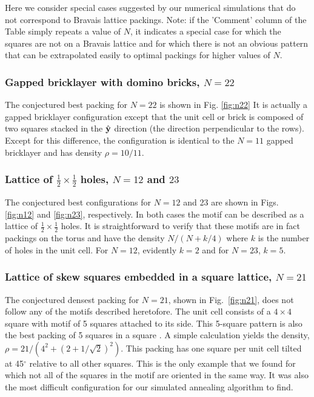 Here we consider special cases suggested by our numerical simulations that do not correspond to Bravais lattice packings.
Note: if the 'Comment' column of the Table simply repeats a value of $N$, it indicates a special case for which the squares are not on a Bravais lattice and for which there is not an obvious pattern that can be extrapolated easily to optimal packings for higher values of $N$.

\subsubsection{Gapped bricklayer with domino bricks, $N=22$}
The conjectured best packing for $N=22$ is shown in Fig. \ref{fig:n22} It is actually a gapped bricklayer configuration except that the unit cell or brick is composed of two squares stacked in the $\hat{{\bf y}}$ direction (the direction perpendicular to the rows).  Except for this difference, the configuration is identical to the $N=11$ gapped bricklayer and has density $\rho= 10/11$.

\subsubsection{Lattice of $\frac{1}{2}\times\frac{1}{2}$ holes, $N=12$ and $23$}
The conjectured best configurations for $N=12$ and 23 are shown in Figs. \ref{fig:n12} and \ref{fig:n23}, respectively.  In both cases the motif can be described as a lattice of $\frac{1}{2}\times\frac{1}{2}$ holes. It is straightforward to verify that these motifs are in fact packings on the torus and have the density $N/(N+k/4)$ where $k$ is the number of holes in the unit cell.  For $N=12$, evidently $k=2$ and for $N=23$, $k=5$. 


\subsubsection{Lattice of skew squares embedded in a square lattice, $N=21$}
The conjectured densest packing for  $N=21$, shown in Fig.\ \ref{fig:n21}, does not follow any of the motifs described heretofore. The unit cell consists of a $4 \times 4$ square with motif of 5 squares attached to its side.  This 5-square pattern is also the best packing of 5 squares in a square \cite{Friedman2002}.  A simple calculation yields the density, $\rho= 21/(4^2+(2+1/\sqrt{2})^2)$.  This packing has one square per unit cell tilted at 45$^{\circ}$ relative to all other squares.  This is the only example that we found for which not all of the squares in the motif are oriented in the same way. It was also the most difficult configuration for our simulated annealing algorithm to find. 

